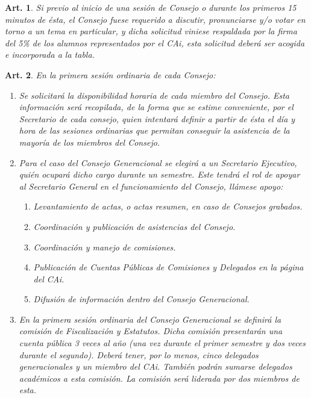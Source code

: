 \documentclass[letterpaper,11pt]{article}
\theoremstyle{plain}
\newtheorem{art}{Art.} %
\begin{document}
			\begin{art}\label{temaPropuestoAlumnado}
				Si previo al inicio de una sesión de Consejo o durante los primeros 15 minutos de ésta, el Consejo fuese requerido a discutir, pronunciarse y/o votar en torno a un tema en particular, y dicha solicitud viniese respaldada por la firma del 5\% de los alumnos representados por el CAi, esta solicitud deberá ser acogida e incorporada a la tabla.
			\end{art}

			\begin{art}\label{fijarAsistencias}
				En la primera sesión ordinaria de cada Consejo:
				\begin{enumerate}
					\item Se solicitará la disponibilidad horaria de cada miembro del Consejo. Esta información será recopilada, de la forma que se estime conveniente, por el Secretario de cada consejo, quien intentará definir a partir de ésta el día y hora de las sesiones ordinarias que permitan conseguir la asistencia de la mayoría de los miembros del Consejo.
					
					\item Para el caso del Consejo Generacional se elegirá a un Secretario Ejecutivo, quién ocupará dicho cargo durante un semestre. Este tendrá el rol de apoyar al Secretario General en el funcionamiento del Consejo, llámese apoyo:
						\begin{enumerate}
							\item Levantamiento de actas, o actas resumen, en caso de Consejos grabados.
							\item Coordinación y publicación de asistencias del Consejo.
							\item Coordinación y manejo de comisiones.
							\item Publicación de Cuentas Públicas de Comisiones y Delegados en la página del CAi.
							\item Difusión de información dentro del Consejo Generacional.
						\end{enumerate}
					
					\item En la primera sesión ordinaria del Consejo Generacional se definirá la comisión de Fiscalización y Estatutos. Dicha comisión presentarán una cuenta pública 3 veces al año (una vez durante el primer semestre y dos veces durante el segundo). Deberá tener, por lo menos, cinco delegados generacionales y un miembro del CAi. También podrán sumarse delegados académicos a esta comisión. La comisión será liderada por dos miembros de esta.
				\end{enumerate}
			\end{art}
\end{document}
